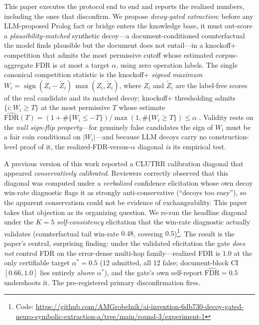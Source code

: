 \documentclass[11pt,letterpaper]{article}
\begin{document}
This paper executes the protocol end to end and reports the realized numbers, including the ones that disconfirm. We propose \emph{decoy-gated extraction}: before any LLM-proposed Prolog fact or bridge enters the knowledge base, it must out-score a \emph{plausibility-matched} synthetic decoy---a document-conditioned counterfactual the model finds plausible but the document does not entail---in a knockoff+ competition that admits the most permissive cutoff whose estimated corpus-aggregate FDR is at most a target $\alpha$, using zero operation labels. The single canonical competition statistic is the knockoff+ \emph{signed maximum} $W_i = \operatorname{sign}(Z_i - \tilde{Z}_i)\,\max(Z_i, \tilde{Z}_i)$, where $Z_i$ and $\tilde{Z}_i$ are the label-free scores of the real candidate and its matched decoy; knockoff+ thresholding admits $\{i : W_i \ge T\}$ at the most permissive $T$ whose estimate $\widehat{\mathrm{FDR}}(T) = (1 + \#\{W_i \le -T\}) / \max(1, \#\{W_i \ge T\}) \le \alpha$ \cite{Barber2015}. Validity rests on the \emph{null sign-flip property}---for genuinely false candidates the sign of $W_i$ must be a fair coin conditional on $|W_i|$---and because LLM decoys carry no construction-level proof of it, the realized-FDR-versus-$\alpha$ diagonal \emph{is} its empirical test.

A previous version of this work reported a CLUTRR calibration diagonal that appeared \emph{conservatively calibrated}. Reviewers correctly observed that this diagonal was computed under a \emph{verbalized} confidence elicitation whose own decoy win-rate diagnostic flags it as strongly anti-conservative (``decoys too easy''), so the apparent conservatism could not be evidence of exchangeability. This paper takes that objection as its organizing question. We re-run the headline diagonal under the $K{=}5$ \emph{self-consistency} elicitation that the win-rate diagnostic actually validates (counterfactual tail win-rate $0.48$, covering $0.5$)\footnote{Code: \url{https://github.com/AMGrobelnik/ai-invention-6db730-decoy-gated-neuro-symbolic-extraction-a/tree/main/round-3/experiment-1}}. The result is the paper's central, surprising finding: under the validated elicitation the gate \emph{does not} control FDR on the error-dense multi-hop family---realized FDR is $1.0$ at the only certifiable target $\alpha^{*}=0.5$ (12 admitted, all 12 false; document-block CI $[0.66,1.0]$ lies entirely above $\alpha^{*}$), and the gate's own self-report $\widehat{\mathrm{FDR}}=0.5$ undershoots it. The pre-registered primary disconfirmation fires.
\end{document}

